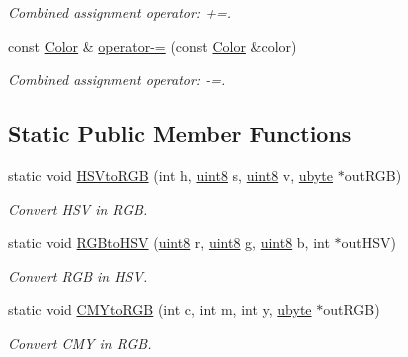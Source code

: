 \begin{DoxyCompactItemize}
\begin{DoxyCompactList}\small\item\em Combined assignment operator: +=. \item\end{DoxyCompactList}\item 
\hypertarget{class_f2_c_1_1_color_a80a25561d7980618700ad9ba9dbee578}{
const \hyperlink{class_f2_c_1_1_color}{Color} \& \hyperlink{class_f2_c_1_1_color_a80a25561d7980618700ad9ba9dbee578}{operator-\/=} (const \hyperlink{class_f2_c_1_1_color}{Color} \&color)}
\label{class_f2_c_1_1_color_a80a25561d7980618700ad9ba9dbee578}

\begin{DoxyCompactList}\small\item\em Combined assignment operator: -\/=. \item\end{DoxyCompactList}\end{DoxyCompactItemize}
\subsection*{Static Public Member Functions}
\begin{DoxyCompactItemize}
\item 
static void \hyperlink{class_f2_c_1_1_color_ad2b6ccb07456cb5bc06190c561285005}{HSVtoRGB} (int h, \hyperlink{namespace_f2_c_a711deb33697d145669b9c0c4fe87c7ca}{uint8} s, \hyperlink{namespace_f2_c_a711deb33697d145669b9c0c4fe87c7ca}{uint8} v, \hyperlink{namespace_f2_c_a74fad364688add30796d711e5635ac77}{ubyte} $\ast$outRGB)
\begin{DoxyCompactList}\small\item\em Convert HSV in RGB. \item\end{DoxyCompactList}\item 
static void \hyperlink{class_f2_c_1_1_color_a36cc8bfa1b46577f90c6e7ab8c5c8941}{RGBtoHSV} (\hyperlink{namespace_f2_c_a711deb33697d145669b9c0c4fe87c7ca}{uint8} r, \hyperlink{namespace_f2_c_a711deb33697d145669b9c0c4fe87c7ca}{uint8} g, \hyperlink{namespace_f2_c_a711deb33697d145669b9c0c4fe87c7ca}{uint8} b, int $\ast$outHSV)
\begin{DoxyCompactList}\small\item\em Convert RGB in HSV. \item\end{DoxyCompactList}\item 
static void \hyperlink{class_f2_c_1_1_color_af4bdd78c58042ed75309350a0df3c742}{CMYtoRGB} (int c, int m, int y, \hyperlink{namespace_f2_c_a74fad364688add30796d711e5635ac77}{ubyte} $\ast$outRGB)
\begin{DoxyCompactList}\small\item\em Convert CMY in RGB. \item\end{DoxyCompactList}\end{DoxyCompactItemize}
